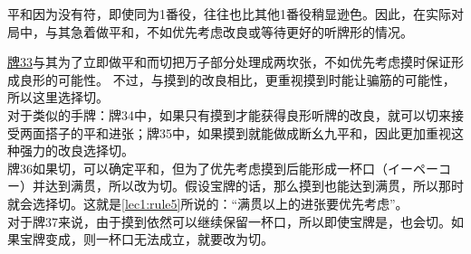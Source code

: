 平和因为没有符，即使同为1番役，往往也比其他1番役稍显逊色。因此，在实际对局中，与其急着做平和，不如优先考虑改良或等待更好的听牌形的情况。

\hyperlink{lec6:pai33-37}{牌33}与其为了立即做平和而切把万子部分处理成两坎张，不如优先考虑摸时保证形成良形的可能性。
不过，与摸到的改良相比，更重视摸到时能让骗筋的可能性，所以这里选择切。\\
对于类似的手牌：牌34中，如果只有摸到才能获得良形听牌的改良，就可以切来接受两面搭子的平和进张；牌35中，如果摸到就能做成断幺九平和，因此更加重视这种强力的改良选择切。\\
牌36如果切，可以确定平和，但为了优先考虑摸到后能形成一杯口（イーペーコー）并达到满贯，所以改为切。假设宝牌的话，那么摸到也能达到满贯，所以那时就会选择切。这就是\ref{lec1:rule5}所说的：“满贯以上的进张要优先考虑”。\\
对于牌37来说，由于摸到依然可以继续保留一杯口，所以即使宝牌是，也会切。如果宝牌变成，则一杯口无法成立，就要改为切。